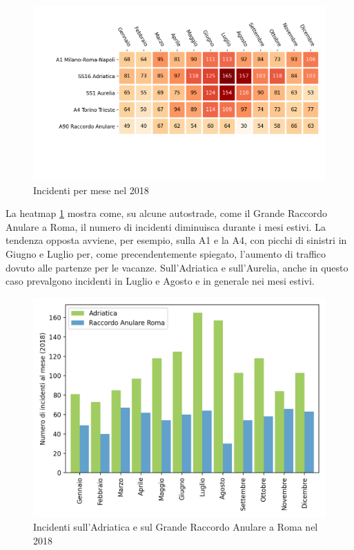 \documentclass[a4paper,12pt]{report}
\begin{document}
\begin{figure}
    \includegraphics[width=\linewidth]{../src/incidenti/incidenti_aci/autostrade/mesi_autostrade.png}
    \caption{Incidenti per mese nel 2018}
    \label{fig:incidenti-per-mese}
\end{figure}

La heatmap \ref{fig:incidenti-per-mese} mostra come, su alcune autostrade, come il 
Grande Raccordo Anulare a Roma, il numero di incidenti diminuisca durante i mesi 
estivi.
La tendenza opposta avviene, per esempio, sulla A1 e la A4, con picchi di 
sinistri in Giugno e Luglio per, come precendentemente spiegato, l'aumento di 
traffico dovuto alle partenze per le vacanze.
Sull'Adriatica e sull'Aurelia, anche in questo caso prevalgono incidenti 
in Luglio e Agosto e in generale nei mesi estivi.

\begin{figure}
    \includegraphics[width=\linewidth]{../src/incidenti/incidenti_aci/autostrade/adriatica_roma.png}
    \caption{Incidenti sull'Adriatica e sul Grande Raccordo Anulare a Roma nel 2018}
    \label{fig:adriatica-roma}
\end{figure}
\end{document}
